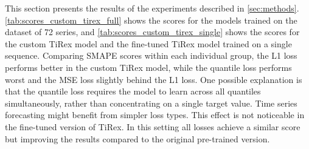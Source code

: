 \documentclass[a4paper,oneside,10pt,ngerman,english]{scrartcl}
\begin{document}
This section presents the results of the experiments described in \autoref{sec:methods}. \autoref{tab:scores_custom_tirex_full} shows the scores for the models trained on the dataset of 72 series, and \autoref{tab:scores_custom_tirex_single} shows the scores for the custom TiRex model and the fine-tuned TiRex model trained on a single sequence. Comparing SMAPE scores within each individual group, the L1 loss performs better in the custom TiRex model, while the quantile loss performs worst and the MSE loss slightly behind the L1 loss. One possible explanation is that the quantile loss requires the model to learn across all quantiles simultaneously, rather than concentrating on a single target value. Time series forecasting might benefit from simpler loss types. This effect is not noticeable in the fine-tuned version of TiRex. In this setting all losses achieve a similar score but improving the results compared to the original pre-trained version.  
\end{document}
